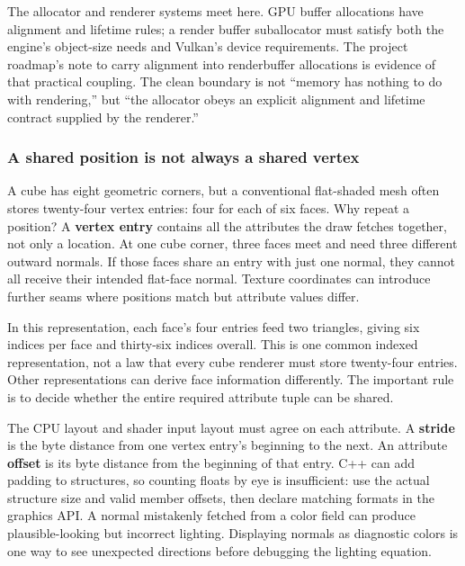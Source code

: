 The allocator and renderer systems meet here. GPU buffer allocations have alignment and lifetime rules; a render buffer suballocator must satisfy both the engine's object-size needs and Vulkan's device requirements. The project roadmap's note to carry alignment into renderbuffer allocations is evidence of that practical coupling. The clean boundary is not ``memory has nothing to do with rendering,'' but ``the allocator obeys an explicit alignment and lifetime contract supplied by the renderer.''

\subsubsection{A shared position is not always a shared vertex}\label{06-engine-ii-ch025-a-shared-position-is-not-always-a-shared-vertex}

\hypertarget{06-engine-ii-ch025-a-shared-position-is-not-always-a-shared-vertex}{}

A cube has eight geometric corners, but a conventional flat-shaded mesh often stores twenty-four vertex entries: four for each of six faces. Why repeat a position? A \textbf{vertex entry} contains all the attributes the draw fetches together, not only a location. At one cube corner, three faces meet and need three different outward normals. If those faces share an entry with just one normal, they cannot all receive their intended flat-face normal. Texture coordinates can introduce further seams where positions match but attribute values differ.

In this representation, each face's four entries feed two triangles, giving six indices per face and thirty-six indices overall. This is one common indexed representation, not a law that every cube renderer must store twenty-four entries. Other representations can derive face information differently. The important rule is to decide whether the entire required attribute tuple can be shared.

The CPU layout and shader input layout must agree on each attribute. A \textbf{stride} is the byte distance from one vertex entry's beginning to the next. An attribute \textbf{offset} is its byte distance from the beginning of that entry. C++ can add padding to structures, so counting floats by eye is insufficient: use the actual structure size and valid member offsets, then declare matching formats in the graphics API. A normal mistakenly fetched from a color field can produce plausible-looking but incorrect lighting. Displaying normals as diagnostic colors is one way to see unexpected directions before debugging the lighting equation.

